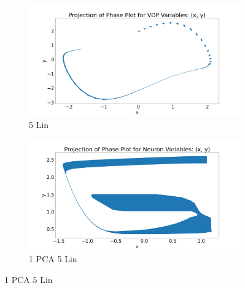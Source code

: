 \begin{figure}[h!]
\begin{subfigure}{0.5\textwidth}
\includegraphics[width=\textwidth]{figures/PhasePlots/VDP_5Lin_.png}
\caption{5 Lin}
\end{subfigure}%
\begin{subfigure}{0.5\textwidth}
\includegraphics[width=\textwidth]{figures/PhasePlots/Neuron_1PCA5Lin_.png}
\caption{1 PCA 5 Lin}
\end{subfigure}%


\end{figure}

